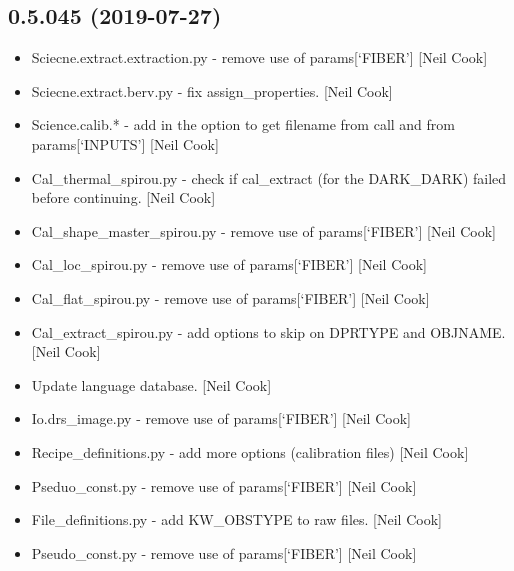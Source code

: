 \documentclass[a4paper,10pt,english]{report}
\begin{document}
\subsection{0.5.045 (2019-07-27)}
\label{\detokenize{misc/changelog:id96}}\begin{itemize}
\item {} 
Sciecne.extract.extraction.py - remove use of params{[}‘FIBER’{]} {[}Neil
Cook{]}

\item {} 
Sciecne.extract.berv.py - fix assign\_properties. {[}Neil Cook{]}

\item {} 
Science.calib.* - add in the option to get filename from call and from
params{[}‘INPUTS’{]} {[}Neil Cook{]}

\item {} 
Cal\_thermal\_spirou.py - check if cal\_extract (for the DARK\_DARK)
failed before continuing. {[}Neil Cook{]}

\item {} 
Cal\_shape\_master\_spirou.py - remove use of params{[}‘FIBER’{]} {[}Neil Cook{]}

\item {} 
Cal\_loc\_spirou.py - remove use of params{[}‘FIBER’{]} {[}Neil Cook{]}

\item {} 
Cal\_flat\_spirou.py - remove use of params{[}‘FIBER’{]} {[}Neil Cook{]}

\item {} 
Cal\_extract\_spirou.py - add options to skip on DPRTYPE and OBJNAME.
{[}Neil Cook{]}

\item {} 
Update language database. {[}Neil Cook{]}

\item {} 
Io.drs\_image.py - remove use of params{[}‘FIBER’{]} {[}Neil Cook{]}

\item {} 
Recipe\_definitions.py - add more options (calibration files) {[}Neil
Cook{]}

\item {} 
Pseduo\_const.py - remove use of params{[}‘FIBER’{]} {[}Neil Cook{]}

\item {} 
File\_definitions.py - add KW\_OBSTYPE to raw files. {[}Neil Cook{]}

\item {} 
Pseudo\_const.py - remove use of params{[}‘FIBER’{]} {[}Neil Cook{]}


\end{itemize}
\end{document}
